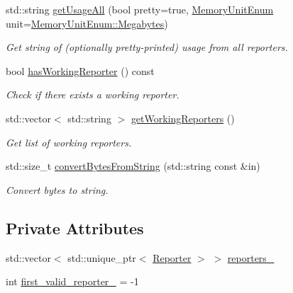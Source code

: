 \begin{DoxyCompactItemize}
std\+::string \hyperlink{structvt_1_1util_1_1memory_1_1_memory_usage_aa37f5b634fb87151fc1688cdba759298}{get\+Usage\+All} (bool pretty=true, \hyperlink{namespacevt_1_1util_1_1memory_a64df3d84293b34009f78e2a1db2f9bb6}{Memory\+Unit\+Enum} unit=\hyperlink{namespacevt_1_1util_1_1memory_a64df3d84293b34009f78e2a1db2f9bb6a2276a1b157f2813f3b65d04c0b1c56f6}{Memory\+Unit\+Enum\+::\+Megabytes})
\begin{DoxyCompactList}\small\item\em Get string of (optionally pretty-\/printed) usage from all reporters. \end{DoxyCompactList}\item 
bool \hyperlink{structvt_1_1util_1_1memory_1_1_memory_usage_aee12dfad3c08673967dd1fcd6a6adfb5}{has\+Working\+Reporter} () const
\begin{DoxyCompactList}\small\item\em Check if there exists a working reporter. \end{DoxyCompactList}\item 
std\+::vector$<$ std\+::string $>$ \hyperlink{structvt_1_1util_1_1memory_1_1_memory_usage_a23bded824e4360e4389d9869c3bd7f18}{get\+Working\+Reporters} ()
\begin{DoxyCompactList}\small\item\em Get list of working reporters. \end{DoxyCompactList}\item 
std\+::size\+\_\+t \hyperlink{structvt_1_1util_1_1memory_1_1_memory_usage_ad047c8acc218403b53ec97c82fa7d7e3}{convert\+Bytes\+From\+String} (std\+::string const \&in)
\begin{DoxyCompactList}\small\item\em Convert bytes to string. \end{DoxyCompactList}\end{DoxyCompactItemize}
\subsection*{Private Attributes}
\begin{DoxyCompactItemize}
\item 
std\+::vector$<$ std\+::unique\+\_\+ptr$<$ \hyperlink{structvt_1_1util_1_1memory_1_1_reporter}{Reporter} $>$ $>$ \hyperlink{structvt_1_1util_1_1memory_1_1_memory_usage_afe2db27e57d4fb6f0356c06a376cd568}{reporters\+\_\+}
\item 
int \hyperlink{structvt_1_1util_1_1memory_1_1_memory_usage_a714d3de79740091fce1761c7c0a858bd}{first\+\_\+valid\+\_\+reporter\+\_\+} = -\/1
\end{DoxyCompactItemize}
